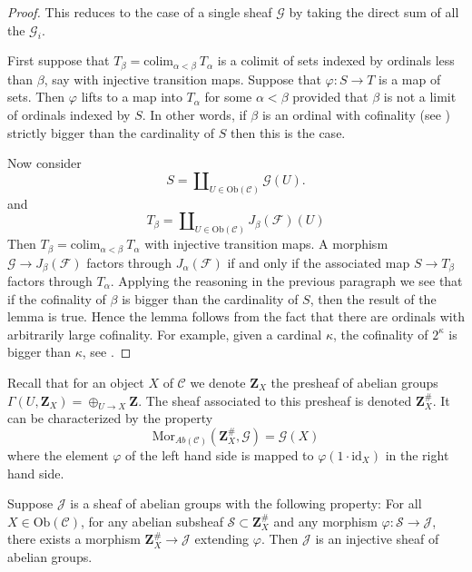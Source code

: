 \begin{proof}
This reduces to the case of a single sheaf $\mathcal{G}$
by taking the direct sum of all the $\mathcal{G}_i$.

\medskip\noindent
First suppose that $T_\beta = \text{colim}_{\alpha < \beta}\ T_\alpha$
is a colimit of sets indexed by ordinals less than $\beta$,
say with injective transition maps.
Suppose that $\varphi : S \to T$ is a map of sets. 
Then $\varphi$ lifts to a map into $T_\alpha$ for some $\alpha < \beta$
provided that $\beta$ is not a limit of ordinals indexed by $S$.
In other words, if $\beta$ is an ordinal with cofinality
(see \cite[Chapter I, Definition 10.30]{Kunen})
strictly bigger than the cardinality of $S$ then this is the case.
 
\medskip\noindent
Now consider
$$
S = \coprod\nolimits_{U \in \text{Ob}(\mathcal{C})} \mathcal{G}(U).
$$
and 
$$
T_\beta
=
\coprod\nolimits_{U \in \text{Ob}(\mathcal{C})} J_\beta(\mathcal{F})(U)
$$
Then $T_\beta =  \text{colim}_{\alpha < \beta}\ T_\alpha$
with injective transition maps.
A morphism $\mathcal{G} \to J_\beta(\mathcal{F})$ factors
through $J_\alpha(\mathcal{F})$ if and only if
the associated map $S \to T_\beta$ factors through $T_\alpha$.
Applying the reasoning in the previous paragraph we see that if
the cofinality of $\beta$
is bigger than the cardinality
of $S$, then the result of the lemma is true. Hence the lemma
follows from the fact that there are ordinals with arbitrarily
large cofinality. For example, given a cardinal $\kappa$,
the cofinality of $2^\kappa$ is bigger than $\kappa$, see
\cite[Chapter I, Corollary 10.41]{Kunen}.
\end{proof}

\noindent
Recall that for an object $X$ of $\mathcal{C}$ we denote $\mathbf{Z}_X$ 
the presheaf of abelian groups $\Gamma(U, \mathbf{Z}_X) = 
\oplus_{U \to X} \mathbf{Z}$. The sheaf associated to this presheaf
is denoted $\mathbf{Z}_X^\#$. It can be characterized by
the property
$$
\text{Mor}_{\textit{Ab}(\mathcal{C})}(\mathbf{Z}_X^\#, \mathcal{G})
=
\mathcal{G}(X)
$$
where the element $\varphi$ of the left hand side is mapped
to $\varphi(1 \cdot \text{id}_X)$ in the right hand side.

\begin{lemma}
\label{lemma-characterize-injectives}
Suppose $\mathcal{J}$ is a sheaf of abelian groups with the following
property: For all $X\in \text{Ob}(\mathcal{C})$, for any abelian subsheaf
$\mathcal{S} \subset \mathbf{Z}_X^\#$ and any morphism
$\varphi : \mathcal{S} \to \mathcal{J}$, there exists a morphism
$\mathbf{Z}_X^\# \to \mathcal{J}$ extending $\varphi$.
Then $\mathcal{J}$ is an injective sheaf of abelian groups.
\end{lemma}

